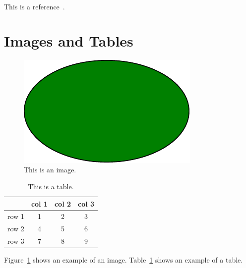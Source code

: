 \documentclass[
	11pt, 
	DIV10,
	ngerman,
	a4paper, 
	oneside, 
	headings=normal, 
	captions=tableheading,
	final, 
	numbers=noenddot
]{scrartcl}
\begin{document}
This is a reference~\cite{Foley:1990}.

\section{Images and Tables}

\begin{figure}[tb]
	\centering
	\includegraphics[width=0.5\linewidth]{images/image} 
	\caption{\label{fig:image} This is an image.
	}
\end{figure}

\begin{table}[tb]
	{
		\centering
		\begin{tabular}{|c|c|c|c|}
			\hline
			& col 1 & col 2 & col 3   \\
			\hline	
			row 1  & 1 & 2 & 3 \\
			row 2  & 4 & 5 & 6 \\
			row 3  & 7 & 8 & 9 \\
			\hline
		\end{tabular}
		\caption{\label{tab:example} This is a table.}
	}
\end{table}


Figure~\ref{fig:image} shows an example of an image.
Table~\ref{tab:example} shows an example of a table.




\end{document}
